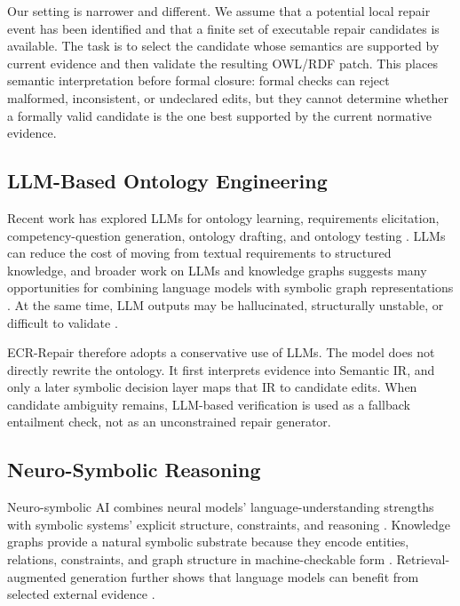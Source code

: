 \documentclass[conference]{IEEEtran}
\begin{document}
Our setting is narrower and different. We assume that a potential local repair event has been identified and that a finite set of executable repair candidates is available. The task is to select the candidate whose semantics are supported by current evidence and then validate the resulting OWL/RDF patch. This places semantic interpretation before formal closure: formal checks can reject malformed, inconsistent, or undeclared edits, but they cannot determine whether a formally valid candidate is the one best supported by the current normative evidence.

\subsection{LLM-Based Ontology Engineering}

Recent work has explored LLMs for ontology learning, requirements elicitation, competency-question generation, ontology drafting, and ontology testing \cite{giglou2024llms4ol,lippolis2025ontologygeneration,zhang2025ontochat,fathallah2025neongpt}. LLMs can reduce the cost of moving from textual requirements to structured knowledge, and broader work on LLMs and knowledge graphs suggests many opportunities for combining language models with symbolic graph representations \cite{pan2024llmkg}. At the same time, LLM outputs may be hallucinated, structurally unstable, or difficult to validate \cite{ji2023hallucination}.

ECR-Repair therefore adopts a conservative use of LLMs. The model does not directly rewrite the ontology. It first interprets evidence into Semantic IR, and only a later symbolic decision layer maps that IR to candidate edits. When candidate ambiguity remains, LLM-based verification is used as a fallback entailment check, not as an unconstrained repair generator.

\subsection{Neuro-Symbolic Reasoning}

Neuro-symbolic AI combines neural models' language-understanding strengths with symbolic systems' explicit structure, constraints, and reasoning \cite{yu2023neurosymbolic}. Knowledge graphs provide a natural symbolic substrate because they encode entities, relations, constraints, and graph structure in machine-checkable form \cite{hogan2021knowledgegraphs}. Retrieval-augmented generation further shows that language models can benefit from selected external evidence \cite{gao2024rag,asai2023selfrag}.
\end{document}
